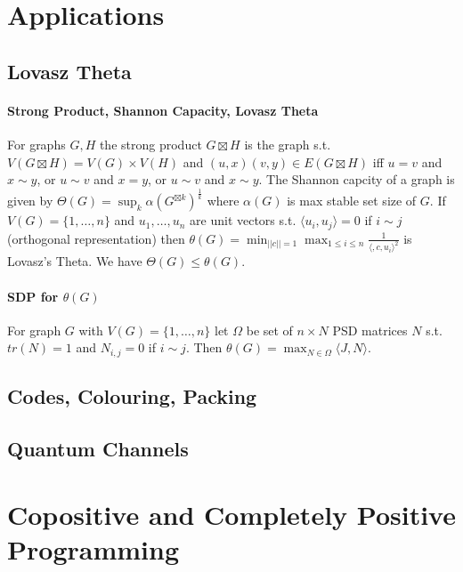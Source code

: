 \documentclass[letterpaper,11pt,oneside,onecolumn]{article}
\begin{document}
\section*{Applications}
\subsection*{Lovasz Theta}
\paragraph{Strong Product, Shannon Capacity, Lovasz Theta} For graphs $G, H$ the strong product $G \boxtimes H$ is the graph s.t. $V(G\boxtimes H) = V(G) \times V(H)$ and $(u,x)(v,y) \in E(G\boxtimes H)$ iff $u=v$ and $x \sim y$, or $u\sim v$ and $x=y$, or $u\sim v$ and $x\sim y$. The Shannon capcity of a graph is given by $\Theta(G) = \sup_k \alpha(G^{\boxtimes k})^\frac{1}{k}$ where $\alpha(G)$ is max stable set size of $G$. If $V(G) = \{1,\dots, n\}$ and $u_1, \dots, u_n$ are unit vectors s.t. $\langle u_i, u_j\rangle = 0$ if $i \sim j$ (orthogonal representation) then $\theta(G) = \min_{||c|| = 1} \max_{1\leq i \leq n} \frac{1}{\langle, c,u_i\rangle^2}$ is Lovasz's Theta. We have $\Theta(G) \leq \theta (G)$.
\paragraph{SDP for $\theta(G)$} For graph $G$ with $V(G) = \{1,\dots,n\}$ let $\Omega$ be set of $n\times N$ PSD matrices $N$ s.t. $tr(N) = 1$ and $N_{i,j} = 0$ if $i\sim j$. Then $\theta(G) = \max_{N \in \Omega} \langle J, N\rangle$.
\subsection*{Codes, Colouring, Packing}
\subsection*{Quantum Channels}
\section*{Copositive and Completely Positive Programming}
\end{document}

